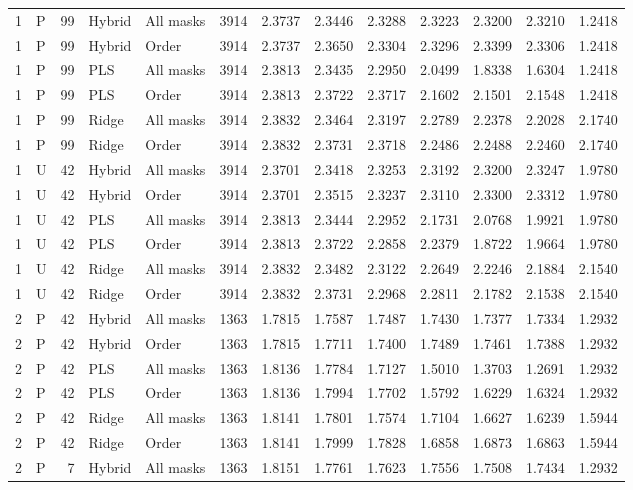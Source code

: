\documentclass[10pt,a4paper]{article}
\begin{document}
\begin{landscape}
\begin{longtable}{rlrllrrrrrrrr}
1 & P & 99 & Hybrid & All masks & 3914 & 2.3737 & 2.3446 & 2.3288 & 2.3223 & 2.3200 & 2.3210 & 1.2418 \\
1 & P & 99 & Hybrid & Order & 3914 & 2.3737 & 2.3650 & 2.3304 & 2.3296 & 2.3399 & 2.3306 & 1.2418 \\
1 & P & 99 & PLS & All masks & 3914 & 2.3813 & 2.3435 & 2.2950 & 2.0499 & 1.8338 & 1.6304 & 1.2418 \\
1 & P & 99 & PLS & Order & 3914 & 2.3813 & 2.3722 & 2.3717 & 2.1602 & 2.1501 & 2.1548 & 1.2418 \\
1 & P & 99 & Ridge & All masks & 3914 & 2.3832 & 2.3464 & 2.3197 & 2.2789 & 2.2378 & 2.2028 & 2.1740 \\
1 & P & 99 & Ridge & Order & 3914 & 2.3832 & 2.3731 & 2.3718 & 2.2486 & 2.2488 & 2.2460 & 2.1740 \\
1 & U & 42 & Hybrid & All masks & 3914 & 2.3701 & 2.3418 & 2.3253 & 2.3192 & 2.3200 & 2.3247 & 1.9780 \\
1 & U & 42 & Hybrid & Order & 3914 & 2.3701 & 2.3515 & 2.3237 & 2.3110 & 2.3300 & 2.3312 & 1.9780 \\
1 & U & 42 & PLS & All masks & 3914 & 2.3813 & 2.3444 & 2.2952 & 2.1731 & 2.0768 & 1.9921 & 1.9780 \\
1 & U & 42 & PLS & Order & 3914 & 2.3813 & 2.3722 & 2.2858 & 2.2379 & 1.8722 & 1.9664 & 1.9780 \\
1 & U & 42 & Ridge & All masks & 3914 & 2.3832 & 2.3482 & 2.3122 & 2.2649 & 2.2246 & 2.1884 & 2.1540 \\
1 & U & 42 & Ridge & Order & 3914 & 2.3832 & 2.3731 & 2.2968 & 2.2811 & 2.1782 & 2.1538 & 2.1540 \\
2 & P & 42 & Hybrid & All masks & 1363 & 1.7815 & 1.7587 & 1.7487 & 1.7430 & 1.7377 & 1.7334 & 1.2932 \\
2 & P & 42 & Hybrid & Order & 1363 & 1.7815 & 1.7711 & 1.7400 & 1.7489 & 1.7461 & 1.7388 & 1.2932 \\
2 & P & 42 & PLS & All masks & 1363 & 1.8136 & 1.7784 & 1.7127 & 1.5010 & 1.3703 & 1.2691 & 1.2932 \\
2 & P & 42 & PLS & Order & 1363 & 1.8136 & 1.7994 & 1.7702 & 1.5792 & 1.6229 & 1.6324 & 1.2932 \\
2 & P & 42 & Ridge & All masks & 1363 & 1.8141 & 1.7801 & 1.7574 & 1.7104 & 1.6627 & 1.6239 & 1.5944 \\
2 & P & 42 & Ridge & Order & 1363 & 1.8141 & 1.7999 & 1.7828 & 1.6858 & 1.6873 & 1.6863 & 1.5944 \\
2 & P & 7 & Hybrid & All masks & 1363 & 1.8151 & 1.7761 & 1.7623 & 1.7556 & 1.7508 & 1.7434 & 1.2932 \\

\end{longtable}
\end{landscape}
\end{document}
